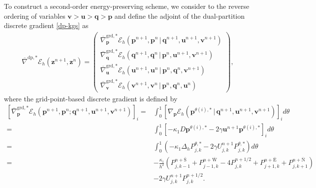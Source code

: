 \documentclass[fleqn,11pt]{elsarticle}
\numberwithin{equation}{section}
\begin{document}
To construct a second-order energy-preserving scheme, we consider to the reverse ordering of variables $\bm{v} > \bm{u} > \bm{q} > \bm{p}$ and define the adjoint of the dual-partition discrete gradient \eqref{dp-kgs} as
\begin{equation*}
	\begin{aligned}
		\overline{\nabla}^{\text{dp},*}\mathcal{E}_h(\bm z^{n+1},\bm z^n)=\left(\begin{array}{l}
		\overline{\nabla}^{\text{grd},*}_{\bm p}\mathcal{E}_h(\bm p^{n+1},\bm p^{n}\,\big|\, \bm q^{n+1},\bm u^{n+1},\bm v^{n+1}) \\[1ex]
		\overline{\nabla}^{\text{grd},*}_{\bm q}\mathcal{E}_h(\bm q^{n+1},\bm q^{n}\,\big|\, \bm p^{n},\bm u^{n+1},\bm v^{n+1})   \\[1ex]
		\overline{\nabla}^{\text{grd},*}_{\bm u}\mathcal{E}_h(\bm u^{n+1},\bm u^{n}\,\big|\, \bm p^{n},\bm q^{n},\bm v^{n+1})     \\[1ex]
		\overline{\nabla}^{\text{grd},*}_{\bm v}\mathcal{E}_h(\bm v^{n+1},\bm v^{n}\,\big|\, \bm p^{n},\bm q^{n},\bm u^{n})
	 \end{array}\right),
	\end{aligned}
\end{equation*}
where the grid-point-based discrete gradient is defined by 
\begin{equation*}
	\begin{aligned}
		\left[\overline{\nabla}^{\text{grd},*}_{\bm p}\mathcal{E}_h(\bm p^{n+1},\bm p^{n}; \bm q^{n+1},\bm u^{n+1},\bm v^{n+1})\right]_{i}= & \int_0^1\left[\nabla_{\bm p}\mathcal{E}_h(\bm p^{\theta(i),*}\,\big|\,\bm q^{n+1},\bm u^{n+1},\bm v^{n+1})\right]_i d\theta                                                                      \\
		=                                                                                                                                   & \int_0^1\left[-\kappa_1D \bm p^{\theta(i),*}-2\gamma \bm u^{n+1}\bm p^{\theta(i),*}\right]_i d\theta                                                                                     \\
		=                                                                                                                                   & \int_0^1\left(-\kappa_1\Delta_h P_{j,k}^{\theta,*}-2\gamma U_{j,k}^{n+1}P_{j,k}^{\theta,*}\right) d\theta                                                                                \\
		=                                                                                                                                   & -\frac{\kappa_1}{h^2}(P_{j,k-1}^{n+\overline{\text{S}}}+P_{j-1, k}^{n+\overline{\text{W}}} - 4 P_{j,k}^{n+1/2}+ P_{j+1, k}^{n+\overline{\text{E}}} + P_{j, k+1}^{n+\overline{\text{N}}}) \\
		    &-2\gamma U_{j,k}^{n+1}P_{j,k}^{n+1/2}.
	\end{aligned}
\end{equation*}
\end{document}
